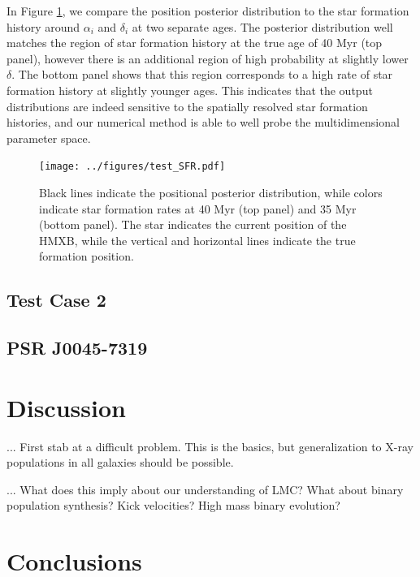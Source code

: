 \documentclass[12pt, preprint]{aastex}
\begin{document}
In Figure \ref{fig:test_SFR}, we compare the position posterior distribution to the star formation history around $\alpha_i$ and $\delta_i$ at two separate ages. The posterior distribution well matches the region of star formation history at the true age of 40 Myr (top panel), however there is an additional region of high probability at slightly lower $\delta$. The bottom panel shows that this region corresponds to a high rate of star formation history at slightly younger ages. This indicates that the output distributions are indeed sensitive to the spatially resolved star formation histories, and our numerical method is able to well probe the multidimensional parameter space.


\begin{figure}[h!]
\begin{center}
\texttt{[image: ../figures/test\_SFR.pdf]}
\caption{Black lines indicate the positional posterior distribution, while colors indicate star formation rates at 40 Myr (top panel) and 35 Myr (bottom panel). The star indicates the current position of the HMXB, while the vertical and horizontal lines indicate the true formation position.}
\label{fig:test_SFR}
\end{center}
\end{figure}


\subsection{Test Case 2}



\subsection{PSR J0045-7319}



\section{Discussion}

... First stab at a difficult problem. This is the basics, but generalization to X-ray populations in all galaxies should be possible.

... What does this imply about our understanding of LMC? What about binary population synthesis? Kick velocities? High mass binary evolution?



\section{Conclusions}
\end{document}
